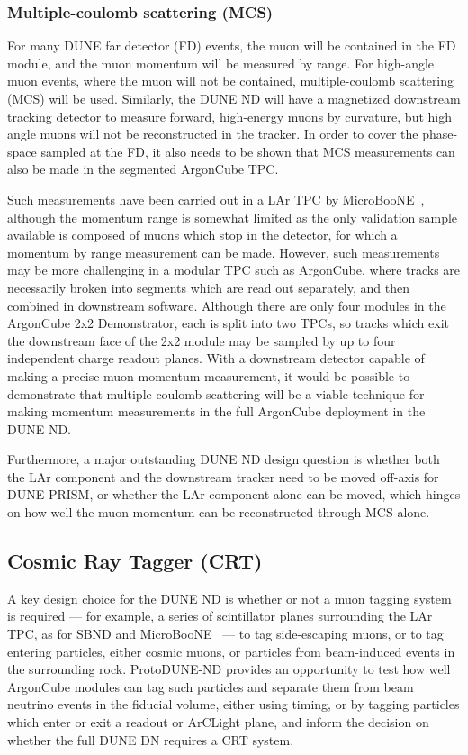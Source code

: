 \subsubsection{Multiple-coulomb scattering (MCS)}
For many DUNE far detector (FD) events, the muon will be contained in the FD module, and the muon momentum will be measured by range. For high-angle muon events, where the muon will not be contained, multiple-coulomb scattering (MCS) will be used. Similarly, the DUNE ND will have a magnetized downstream tracking detector to measure forward, high-energy muons by curvature, but high angle muons will not be reconstructed in the tracker. In order to cover the phase-space sampled at the FD, it also needs to be shown that MCS measurements can also be made in the segmented ArgonCube TPC.

Such measurements have been carried out in a LAr TPC by MicroBooNE~\cite{Abratenko:2017nki}, although the momentum range is somewhat limited as the only validation sample available is composed of muons which stop in the detector, for which a momentum by range measurement can be made. However, such measurements may be more challenging in a modular TPC such as ArgonCube, where tracks are necessarily broken into segments which are read out separately, and then combined in downstream software. Although there are only four modules in the ArgonCube 2x2 Demonstrator, each is split into two TPCs, so tracks which exit the downstream face of the 2x2 module may be sampled by up to four independent charge readout planes. With a downstream detector capable of making a precise muon momentum measurement, it would be possible to demonstrate that multiple coulomb scattering will be a viable technique for making momentum measurements in the full ArgonCube deployment in the DUNE ND.

Furthermore, a major outstanding DUNE ND design question is whether both the LAr component and the downstream tracker need to be moved off-axis for DUNE-PRISM, or whether the LAr component alone can be moved, which hinges on how well the muon momentum can be reconstructed through MCS alone.

\subsection{Cosmic Ray Tagger (CRT)}
A key design choice for the DUNE ND is whether or not a muon tagging system is required --- for example, a series of scintillator planes surrounding the LAr TPC, as for SBND and MicroBooNE~\cite{CRT} --- to tag side-escaping muons, or to tag entering particles, either cosmic muons, or particles from beam-induced events in the surrounding rock. ProtoDUNE-ND provides an opportunity to test how well ArgonCube modules can tag such particles and separate them from beam neutrino events in the fiducial volume, either using timing, or by tagging particles which enter or exit a readout or ArCLight plane, and inform the decision on whether the full DUNE DN requires a CRT system.


